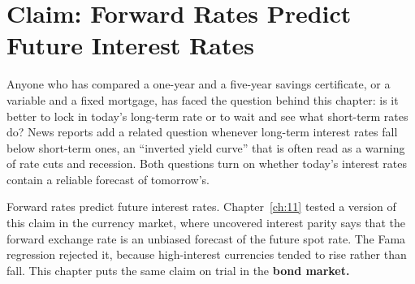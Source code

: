 \makeatletter
{}
\makeatother

\makeatletter
\makeatother

\chapter{Claim: Forward Rates Predict Future Interest Rates}
\label{ch:12}

Anyone who has compared a one-year and a five-year savings certificate, or a variable and a fixed mortgage, has faced the question behind this chapter: is it better to lock in today's long-term rate or to wait and see what short-term rates do? News reports add a related question whenever long-term interest rates fall below short-term ones, an ``inverted yield curve'' that is often read as a warning of rate cuts and recession. Both questions turn on whether today's interest rates contain a reliable forecast of tomorrow's.

Forward rates predict future interest rates. Chapter~\ref{ch:11} tested a version of this claim in the currency market, where uncovered interest parity says that the forward exchange rate is an unbiased forecast of the future spot rate. The Fama regression rejected it, because high-interest currencies tended to rise rather than fall. This chapter puts the same claim on trial in the \textbf{bond market.}

